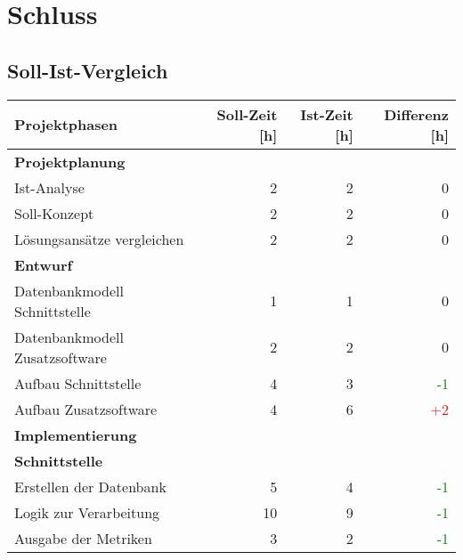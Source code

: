 \section{Schluss}
\subsection{Soll-Ist-Vergleich}
\begin{center}
    \begin{tabular}{ |l|r|r|r| }
        \hline
        \textbf{Projektphasen} & \textbf{Soll-Zeit [h]} & \textbf{Ist-Zeit [h]} & \textbf{Differenz [h]} \\
        \hline  
        \textbf{Projektplanung} & & & \\
        \hspace{0.65cm} Ist-Analyse & 2 & 2 & 0 \\
        \hspace{0.65cm} Soll-Konzept & 2 & 2 & 0 \\
        \hspace{0.65cm} Lösungsansätze vergleichen & 2 & 2 & 0 \\
        \hline  
        \textbf{Entwurf} & & & \\
        \hspace{0.65cm} Datenbankmodell Schnittstelle & 1 & 1 & 0\\
        \hspace{0.65cm} Datenbankmodell Zusatzsoftware & 2 & 2 & 0 \\
        \hspace{0.65cm} Aufbau Schnittstelle & 4 & 3 & \textcolor{Green}{-1}\\
        \hspace{0.65cm} Aufbau Zusatzsoftware & 4 & 6 & \textcolor{red}{+2} \\
        \hline  
        \textbf{Implementierung} & & & \\
        \hspace{0.65cm} \textbf{Schnittstelle} & & & \\
        \hspace{1.3cm} Erstellen der Datenbank & 5 & 4 & \textcolor{Green}{-1} \\
        \hspace{1.3cm} Logik zur Verarbeitung & 10 & 9 & \textcolor{Green}{-1} \\
        \hspace{1.3cm} Ausgabe der Metriken & 3 & 2 & \textcolor{Green}{-1} \\
        \hline  

\end{tabular}
\end{center}
